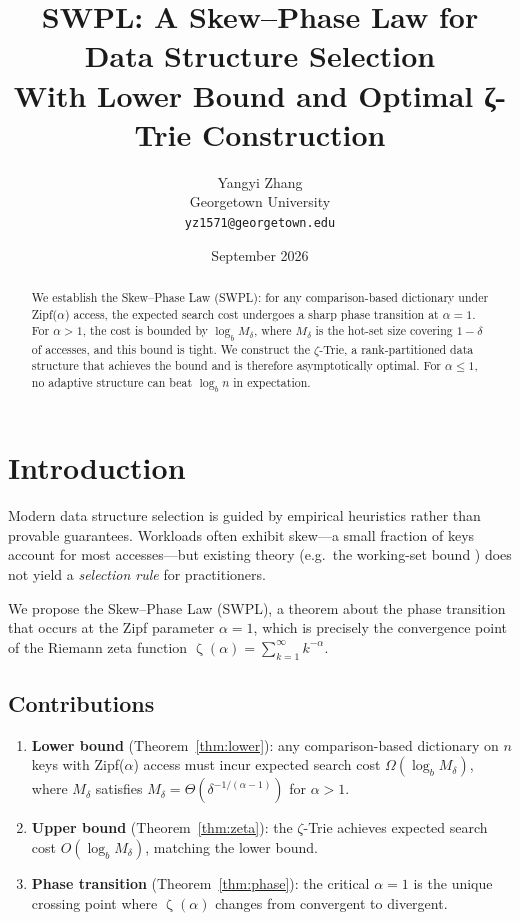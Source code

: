 \documentclass[11pt]{article}
\title{SWPL: A Skew--Phase Law for Data Structure Selection\\
       \large With Lower Bound and Optimal ζ-Trie Construction}
\author{Yangyi Zhang\\
        Georgetown University\\
        \texttt{yz1571@georgetown.edu}}
\date{September 2026}
\DeclareMathOperator{\Zeta}{\zeta}
\begin{document}
\maketitle

\begin{abstract}
We establish the Skew--Phase Law (SWPL): for any comparison-based dictionary
under Zipf($\alpha$) access, the expected search cost undergoes a sharp phase
transition at $\alpha=1$.  For $\alpha>1$, the cost is bounded by $\log_b M_δ$,
where $M_δ$ is the hot-set size covering $1-δ$ of accesses, and this bound
is tight.  We construct the $\zeta$-Trie, a rank-partitioned data structure
that achieves the bound and is therefore asymptotically optimal.  For $\alpha\le1$,
no adaptive structure can beat $\log_b n$ in expectation.
\end{abstract}

\section{Introduction}

Modern data structure selection is guided by empirical heuristics rather than
provable guarantees.  Workloads often exhibit skew---a small fraction of keys
account for most accesses---but existing theory (e.g.\ the working-set bound
\cite{sleator85}) does not yield a \emph{selection rule} for practitioners.

We propose the Skew--Phase Law (SWPL), a theorem about the phase transition
that occurs at the Zipf parameter $\alpha=1$, which is precisely the
convergence point of the Riemann zeta function $\Zeta(\alpha)=\sum_{k=1}^\infty k^{-\alpha}$.

\subsection{Contributions}

\begin{enumerate}
  \item \textbf{Lower bound} (Theorem~\ref{thm:lower}): any comparison-based
        dictionary on $n$ keys with Zipf($\alpha$) access must incur expected
        search cost $\Omega(\log_b M_δ)$, where $M_δ$ satisfies
        $M_δ = \Theta(δ^{-1/(\alpha-1)})$ for $\alpha>1$.
  \item \textbf{Upper bound} (Theorem~\ref{thm:zeta}): the $\zeta$-Trie achieves
        expected search cost $O(\log_b M_δ)$, matching the lower bound.
  \item \textbf{Phase transition} (Theorem~\ref{thm:phase}): the critical
        $\alpha=1$ is the unique crossing point where $\Zeta(\alpha)$ changes
        from convergent to divergent.
\end{enumerate}
\end{document}
